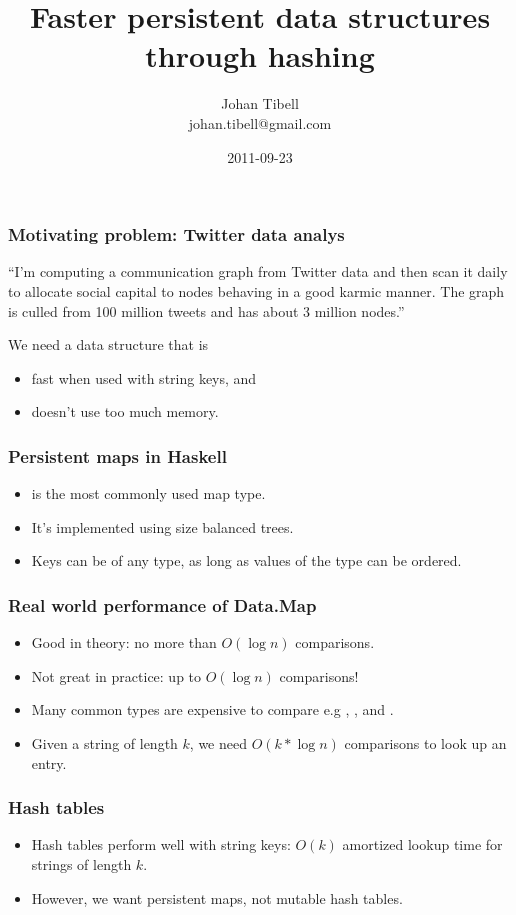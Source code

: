 \documentclass[xetex,mathserif,serif]{beamer}
\title{Faster persistent data structures through hashing}
\author{Johan Tibell\\johan.tibell@gmail.com}
\date{2011-09-23}
\newcommand{\code}[1]{\mbox{\texttt{\small{\color{CodeColor}{#1}}}}}
\begin{document}

\frame{\titlepage}

\begin{frame}
  \frametitle{Motivating problem: Twitter data analys}

  ``I'm computing a communication graph from Twitter data and then
  scan it daily to allocate social capital to nodes behaving in a good
  karmic manner.  The graph is culled from 100 million tweets and has
  about 3 million nodes.''

  \bigskip
  We need a data structure that is
  \begin{itemize}
  \item fast when used with string keys, and
  \item doesn't use too much memory.
  \end{itemize}
\end{frame}

\begin{frame}
  \frametitle{Persistent maps in Haskell}

  \begin{itemize}
  \item \code{Data.Map} is the most commonly used map type.
  \item It's implemented using size balanced trees.
  \item Keys can be of any type, as long as values of the type can be
    ordered.
  \end{itemize}
\end{frame}

\begin{frame}
  \frametitle{Real world performance of Data.Map}

  \begin{itemize}
  \item Good in theory: no more than $O(\log n)$ comparisons.
  \item Not great in practice: up to $O(\log n)$ comparisons!
  \item Many common types are expensive to compare e.g
    \code{String}, \code{ByteString}, and \code{Text}.
  \item Given a string of length $k$, we need $O(k*\log n)$
    comparisons to look up an entry.
  \end{itemize}
\end{frame}

\begin{frame}
  \frametitle{Hash tables}
  \begin{itemize}
  \item Hash tables perform well with string keys: $O(k)$ amortized
    lookup time for strings of length $k$.
  \item However, we want persistent maps, not mutable hash tables.
  \end{itemize}
\end{frame}
\end{document}
